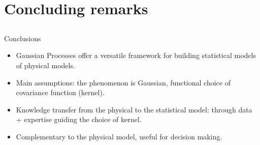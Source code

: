 \section[Conclusions]{Concluding remarks}
\subsection{}
\begin{frame}{}
\begin{exampleblock}{Conclusions}
\begin{itemize}
\item Gaussian Processes offer a versatile framework for building statistical models of physical models.
\item Main assumptions: the phenomenon is Gaussian, functional choice of covariance function (kernel).
\item Knowledge transfer from the physical to the statistical model: through data + expertise guiding 
the choice of kernel.
\item Complementary to the physical model, useful for decision making.
\end{itemize}
\end{exampleblock}

\end{frame}

